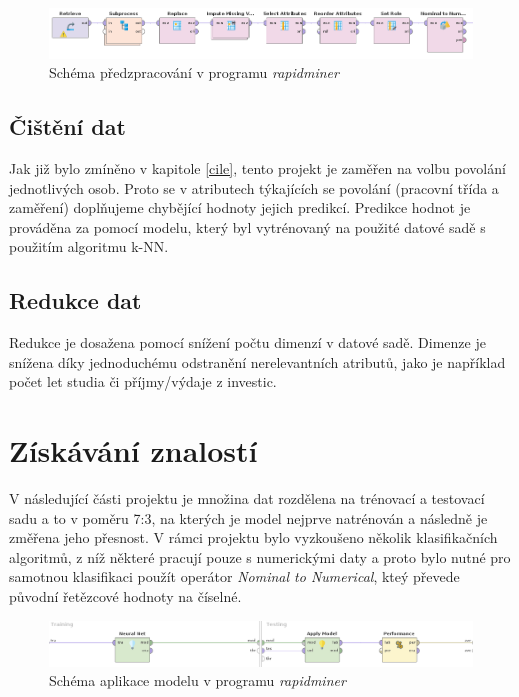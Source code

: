 \documentclass[11pt,a4paper,titlepage]{article}
\begin{document}
        \begin{figure}[H]
            \centering
            \includegraphics[width=1\textwidth]{./img/predzpracovani.png}
            \caption{Schéma předzpracování v programu \textit{rapidminer}}
        \end{figure}
        
        \subsection{Čištění dat}
            Jak již bylo zmíněno v kapitole \ref{cile}, tento projekt je zaměřen na volbu povolání jednotlivých osob. Proto se v atributech týkajících se povolání (pracovní třída a zaměření) doplňujeme chybějící hodnoty jejich predikcí. Predikce hodnot je prováděna za pomocí modelu, který byl vytrénovaný na použité datové sadě s použitím algoritmu k-NN.
        
        \subsection{Redukce dat}
            Redukce je dosažena pomocí snížení počtu dimenzí v datové sadě. Dimenze je snížena díky jednoduchému odstranění nerelevantních atributů, jako je například
            počet let studia či příjmy/výdaje z investic.
    
    \section{Získávání znalostí}
        V následující části projektu je množina dat rozdělena na trénovací a testovací sadu a to v poměru 7:3, na kterých je model nejprve natrénován a následně je změřena jeho přesnost. V rámci projektu bylo vyzkoušeno několik klasifikačních algoritmů, z níž některé pracují pouze s numerickými daty a proto bylo nutné pro samotnou klasifikaci použít operátor \textit{Nominal to Numerical}, kteý převede původní řetězcové hodnoty na číselné.

        \begin{figure}[H]
            \centering
            \includegraphics[width=1\textwidth]{./img/zpracovani.png}
            \caption{Schéma aplikace modelu v programu \textit{rapidminer}}
        \end{figure}
\end{document}
